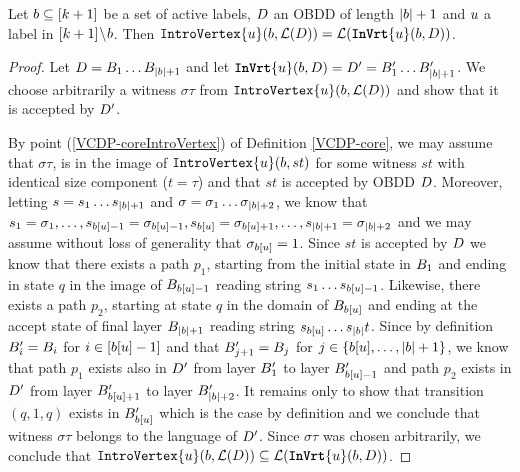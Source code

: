 \begin{lemma}
\label{lemma:IntroVertexAppendix}
Let $b \subseteq [k+1]$ be a set of active labels, $D$ an OBDD of length $|b|+1$ and $u$ a label in $[k+1]\negthinspace\setminus \negthinspace b$. Then  $\texttt{IntroVertex}\{u\}(b, \mathcal{L}(D))  = \mathcal{L}(\texttt{\textbf{InVrt}}\{u\}(b, D))$.
\end{lemma}
\begin{proof}
Let $D = B_1\dots B_{|b|+1}$ and let $\texttt{\textbf{InVrt}}\{u\}(b, D)= D' = B'_1\dots B'_{|b|+1}$.
We choose arbitrarily a witness $\sigma\tau$ from $\texttt{IntroVertex}\{u\}(b,\mathcal{L}(D))$ and show that it is accepted by $D'$. 

By point (\ref{VCDP-coreIntroVertex}) of Definition \ref{VCDP-core}, we may assume that $\sigma\tau$, is in the image of $\texttt{IntroVertex}\{u\}(b, st)$ for some witness $st$ with identical size component ($t=\tau$) and that $st$ is accepted by OBDD $D$. Moreover, letting $s = s_1\dots s_{|b| +1}$ and $\sigma = \sigma_1 \dots \sigma_{|b|+2}$, we know that $s_1 = \sigma_1, \ldots, s_{b[u]-1} = \sigma_{b[u]-1}, s_{b[u]} = \sigma_{b[u]+1}, \ldots, s_{|b| + 1} = \sigma_{|b|+2}$ and we may assume without loss of generality that $\sigma_{b[u]} = 1$. Since $st$ is accepted by $D$ we know that there exists a path $p_1$, starting from the initial state in $B_1$ and ending in state $q$ in the image of $B_{b[u]-1}$ reading string $s_1\dots s_{b[u]-1}$. Likewise, there exists a path $p_2$, starting at state $q$ in the domain of $B_{b[u]}$ and ending at the accept state of final layer $B_{|b|+1}$ reading string $s_{b[u]}\dots s_{|b|}t$. 
Since by definition  $B'_i =B_i$ for $i \in [b[u]-1]$ and that $ B'_{j+1}=B_j$ for $j \in \{b[u], \ldots, |b|+1\}$, we know that path $p_1$ exists also in $D'$ from layer $B'_1$ to layer $B'_{b[u] - 1}$ and path $p_2$ exists in $D'$ from layer $B'_{b[u]+1}$ to layer $B'_{|b|+2}$. It remains only to show that transition $(q,1,q)$ exists in $B'_{b[u]}$ which is the case by definition and we conclude that witness $\sigma\tau$ belongs to the language of $D'$. Since $\sigma\tau$ was chosen arbitrarily, we conclude that $\texttt{IntroVertex}\{u\}(b, \mathcal{L}(D))\subseteq \mathcal{L}(\texttt{\textbf{InVrt}}\{u\}(b,D))$.


\end{proof}
